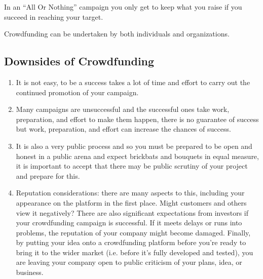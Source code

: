 In an “All Or Nothing” campaign you only get to keep what you raise if you succeed in reaching your target.

Crowdfunding can be undertaken by both individuals and organizations.


\subsection*{ Downsides of Crowdfunding}
\begin{enumerate}
      \item It is not easy, to be a success takes a lot of time and effort to carry out the continued promotion of your campaign.
      \item Many campaigns are unsuccessful and the successful ones take work, preparation, and effort to make them happen, there is no guarantee of success but work, preparation, and effort can increase the chances of success.
      \item It is also a very public process and so you must be prepared to be open and honest in a public arena and expect brickbats and bouquets in equal measure, it is important to accept that there may be public scrutiny of your project and prepare for this.
      \item Reputation considerations: there are many aspects to this, including your appearance on the platform in the first place. Might customers and others view it negatively? There are also significant expectations from investors if your crowdfunding campaign is successful. If it meets delays or runs into problems, the reputation of your company might become damaged. Finally, by putting your idea onto a crowdfunding platform before you’re ready to bring it to the wider market (i.e. before it’s fully developed and tested), you are leaving your company open to public criticism of your plans, idea, or business.
\end{enumerate}



